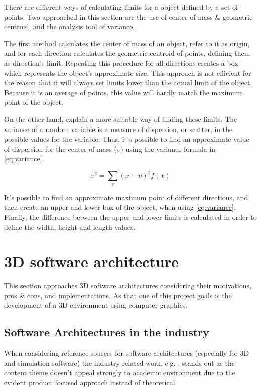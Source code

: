     There are different ways of calculating limits for a object defined by a set of points. Two approached in this section are the use of center of mass \& geometric centroid, and the analysis tool of variance.

    The first method calculates the center of mass of an object, refer to it as origin, and for each direction calculates the geometric centroid of points, defining them as direction's limit. Repeating this procedure for all directions creates a box which represents the object's approximate size. This approach is not efficient for the reason that it will always set limits lower than the actual limit of the object. Because it is an average of points, this value will hardly match the maximum point of the object.

    On the other hand, \cite{estatistic-douglas} explain a more suitable way of finding these limits. The variance of a random variable is a measure of dispersion, or scatter, in the possible values for the variable. Thus, it's possible to find an approximate value of dispersion for the center of mass (\(\upsilon\)) using the variance formula in \autoref{eq:variance}.

    \begin{equation}\label{eq:variance}
    \sigma^{2} = \sum_{x}(x-\upsilon)^{2}f(x) 
    \end{equation}

    It's possible to find an approximate maximum point of different directions, and then create an upper and lower box of the object, when using \autoref{eq:variance}. Finally, the difference between the upper and lower limits is calculated in order to define the width, height and length values.


\section{3D software architecture}

    This section approaches 3D software architectures considering their motivations, pros \& cons, and implementations. As that one of this project goals is the development of a 3D environment using computer graphics.
    
\subsection{Software Architectures in the industry}

    When considering reference sources for software architectures (especially for 3D and simulation software) the industry related work, e.g. \cite{leonard-thief-postmortem}, stands out as the content theme doesn't appeal strongly to academic environment due to the evident product focused approach instead of theoretical.
    

